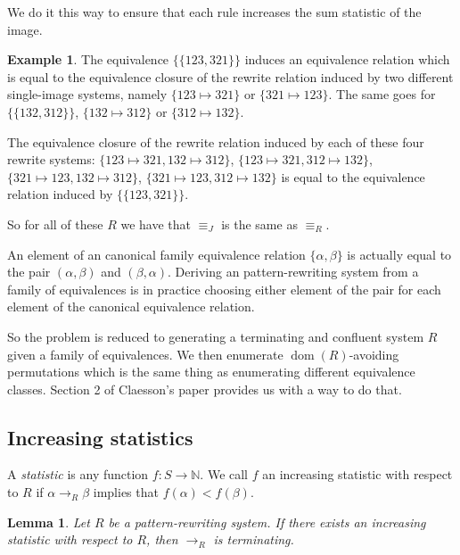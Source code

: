 \documentclass[a4paper, 11pt, english]{article}
\newcommand{\patternrule}{ \mapsto \!}
\newtheorem{lemma}[theorem]{Lemma}
\theoremstyle{definition}
\newtheorem{example}[theorem]{Example}
\newcommand{\Sym}{S}
\DeclareMathOperator{\dom}{dom}
\begin{document}
We do it this way to ensure that each rule increases the sum statistic of the
image.

\begin{example}
    The equivalence $\{ \{123, 321 \} \}$ induces an equivalence relation which is
    equal to the equivalence closure of the rewrite relation induced by two
    different single-image systems, namely $\{123 \patternrule 321\}$ or $\{321
    \patternrule 123\}$. The same goes for $\{ \{ 132, 312 \} \}$, $\{132 \patternrule
    312\}$ or $\{312 \patternrule 132\}$.

    The equivalence closure of the rewrite relation induced by each of these
    four rewrite systems: $\{123 \patternrule 321, 132 \patternrule 312\}$, $\{123
    \patternrule 321, 312 \patternrule 132\}$, $\{321 \patternrule 123, 132
    \patternrule 312\}$, $\{321 \patternrule 123, 312 \patternrule 132\}$ is
    equal to the equivalence relation induced by $\{ \{ 123, 321 \} \}$.

    So for all of these $R$ we have that $\equiv_J$ is the same as $\equiv_R$.
\end{example}

An element of an canonical family equivalence relation $\{ \alpha, \beta \}$ is
actually equal to the pair $(\alpha, \beta)$ and $(\beta, \alpha)$.
Deriving an pattern-rewriting system from a family of equivalences is in
practice choosing either element of the pair for each element of the canonical
equivalence relation.

So the problem is reduced to generating a terminating and confluent system $R$
given a family of equivalences. We then enumerate $\dom(R)$-avoiding
permutations which is the same thing as enumerating different equivalence
classes.  Section 2 of Claesson's paper provides us with a way to do that.
\cite{claesson:2021}

\subsection{Increasing statistics}
A \emph{statistic} is any function $f : \Sym \to \mathbb{N}$. We call $f$ an increasing
statistic with respect to $R$ if $\alpha \to_R \beta$ implies that $f(\alpha) < f(\beta)$.

\begin{lemma}
    Let $R$ be a pattern-rewriting system. If there exists an increasing
    statistic with respect to $R$, then $\to_R$ is terminating.    
\end{lemma}
\end{document}
